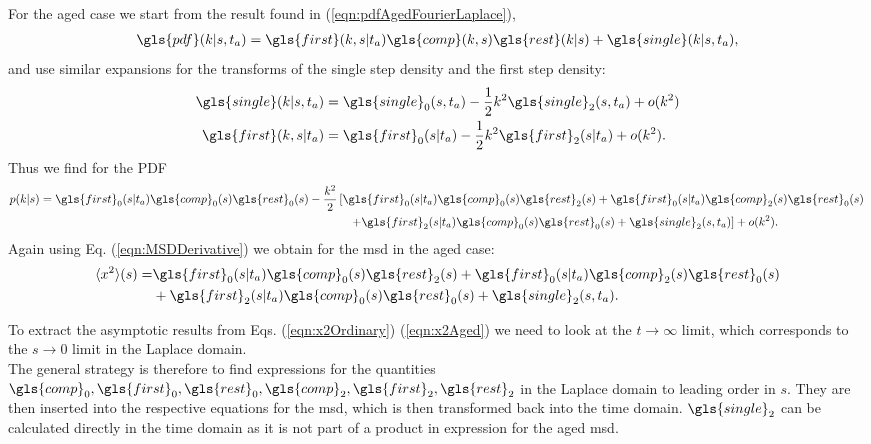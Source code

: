 For the aged case we start from the result found in (\ref{eqn:pdfAgedFourierLaplace}),
%
\begin{align}
\gls{pdf}(k|s,t_a) =  \gls{first}(k,s|t_a)  \gls{comp}(k,s) \gls{rest}(k|s) + \gls{single}(k|s,t_a) ,
\end{align}
%
and use similar expansions for the transforms of the single step density and the first step density:
%
\begin{align}
\gls{single}(k|s,t_a) &= \gls{single}_0(s,t_a) - \frac{1}{2} k^2 \gls{single}_2 (s,t_a) + o(k^2)\\ 
\gls{first}(k,s|t_a) &= \gls{first}_0(s|t_a)- \frac{1}{2} k^2 \gls{first}_2(s|t_a) + o(k^2) .
\end{align}
%
Thus we find for the \gls{PDF}
%
\begin{align}
\begin{split}
 p(k|s) = \gls{first}_0(s|t_a)\gls{comp}_0(s)\gls{rest}_0(s) - \frac{k^2}{2} &\left[ \gls{first}_0(s|t_a)\gls{comp}_0(s) \gls{rest}_2(s) +\gls{first}_0(s|t_a)\gls{comp}_2(s)\gls{rest}_0(s)  \right. \\
 & \quad \left. + \gls{first}_2(s|t_a)\gls{comp}_0(s) \gls{rest}_0(s) + \gls{single}_2(s,t_a)\right] +o(k^2) .
\end{split}
\end{align}
%
Again using Eq. (\ref{eqn:MSDDerivative}) we obtain for the \gls{msd} in the aged case:
%
\begin{align}
\mean{x^2}(s) =& \gls{first}_0(s|t_a)\gls{comp}_0(s) \gls{rest}_2(s) +\gls{first}_0(s|t_a)\gls{comp}_2(s)\gls{rest}_0(s)  \\
& + \gls{first}_2(s|t_a)\gls{comp}_0(s) \gls{rest}_0(s) + \gls{single}_2(s,t_a)  \nonumber \label{eqn:x2Aged}.
\end{align}

To extract the asymptotic results from Eqs. (\ref{eqn:x2Ordinary}) (\ref{eqn:x2Aged}) we need to look at the $t \to \infty$ limit, which corresponds to the $s \to 0$ limit in the Laplace domain. \\
The general strategy is therefore to find expressions for the quantities $\gls{comp}_0, \gls{first}_0, \gls{rest}_0, \gls{comp}_2, \gls{first}_2, \gls{rest}_2$ in the Laplace domain to leading order in $s$. They are then inserted into the respective equations for the \gls{msd}, which is then transformed back into the time domain. $\gls{single}_2$ can be calculated directly in the time domain as it is not part of a product in expression for the aged \gls{msd}. 


